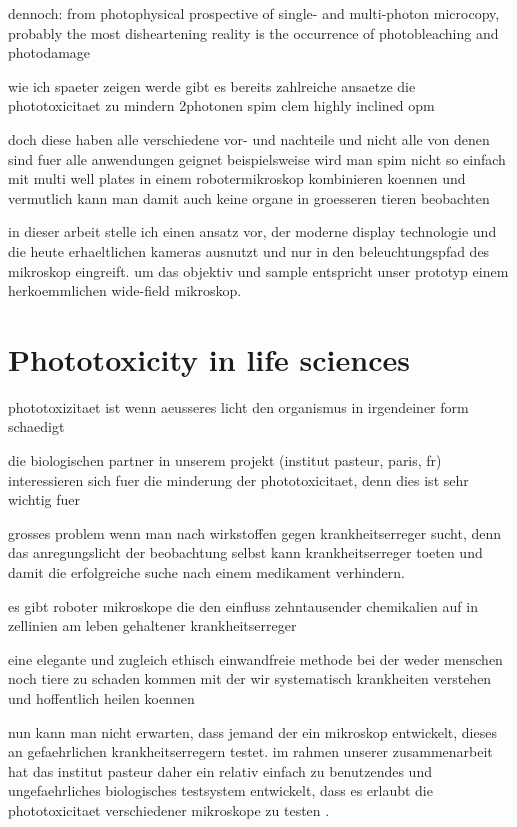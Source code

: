 dennoch: from photophysical prospective of single- and multi-photon
microcopy, probably the most disheartening reality is the occurrence
of photobleaching and photodamage

\citep{diaspro2009nanoscopy}


wie ich spaeter zeigen werde gibt es bereits zahlreiche ansaetze die
phototoxicitaet zu mindern 2photonen spim clem highly inclined opm

doch diese haben alle verschiedene vor- und nachteile und nicht alle
von denen sind fuer alle anwendungen geignet beispielsweise wird man
spim nicht so einfach mit multi well plates in einem robotermikroskop
kombinieren koennen und vermutlich kann man damit auch keine organe in
groesseren tieren beobachten

in dieser arbeit stelle ich einen ansatz vor, der moderne display
technologie und die heute erhaeltlichen kameras ausnutzt und nur in
den beleuchtungspfad des mikroskop eingreift. um das objektiv und
sample entspricht unser prototyp einem herkoemmlichen wide-field
mikroskop.








\section{Phototoxicity in life sciences}

phototoxizitaet ist wenn aeusseres licht den organismus in irgendeiner
form schaedigt

die biologischen partner in unserem projekt (institut pasteur, paris,
fr) interessieren sich fuer die minderung der phototoxicitaet, denn
dies ist sehr wichtig fuer 

grosses problem wenn man nach wirkstoffen gegen krankheitserreger
sucht, denn das anregungslicht der beobachtung selbst kann
krankheitserreger toeten und damit die erfolgreiche suche nach einem
medikament verhindern.

es gibt roboter mikroskope die den einfluss zehntausender chemikalien
auf in zellinien am leben gehaltener krankheitserreger

eine elegante und zugleich ethisch einwandfreie methode bei der weder
menschen noch tiere zu schaden kommen mit der wir systematisch
krankheiten verstehen und hoffentlich heilen koennen



nun kann man nicht erwarten, dass jemand der ein mikroskop entwickelt,
dieses an gefaehrlichen krankheitserregern testet. im rahmen unserer
zusammenarbeit hat das institut pasteur daher ein relativ einfach zu
benutzendes und ungefaehrliches biologisches testsystem entwickelt,
dass es erlaubt die phototoxicitaet verschiedener mikroskope zu testen
\citep{Tinevez2012}.


